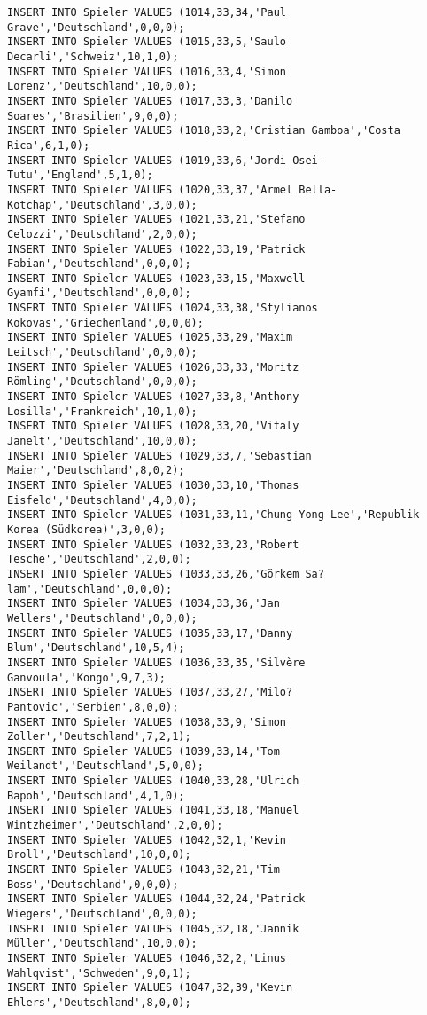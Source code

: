 \documentclass{bschlangaul-aufgabe}
\begin{document}
\begin{verbatim}
INSERT INTO Spieler VALUES (1014,33,34,'Paul Grave','Deutschland',0,0,0);
INSERT INTO Spieler VALUES (1015,33,5,'Saulo Decarli','Schweiz',10,1,0);
INSERT INTO Spieler VALUES (1016,33,4,'Simon Lorenz','Deutschland',10,0,0);
INSERT INTO Spieler VALUES (1017,33,3,'Danilo Soares','Brasilien',9,0,0);
INSERT INTO Spieler VALUES (1018,33,2,'Cristian Gamboa','Costa Rica',6,1,0);
INSERT INTO Spieler VALUES (1019,33,6,'Jordi Osei-Tutu','England',5,1,0);
INSERT INTO Spieler VALUES (1020,33,37,'Armel Bella-Kotchap','Deutschland',3,0,0);
INSERT INTO Spieler VALUES (1021,33,21,'Stefano Celozzi','Deutschland',2,0,0);
INSERT INTO Spieler VALUES (1022,33,19,'Patrick Fabian','Deutschland',0,0,0);
INSERT INTO Spieler VALUES (1023,33,15,'Maxwell Gyamfi','Deutschland',0,0,0);
INSERT INTO Spieler VALUES (1024,33,38,'Stylianos Kokovas','Griechenland',0,0,0);
INSERT INTO Spieler VALUES (1025,33,29,'Maxim Leitsch','Deutschland',0,0,0);
INSERT INTO Spieler VALUES (1026,33,33,'Moritz Römling','Deutschland',0,0,0);
INSERT INTO Spieler VALUES (1027,33,8,'Anthony Losilla','Frankreich',10,1,0);
INSERT INTO Spieler VALUES (1028,33,20,'Vitaly Janelt','Deutschland',10,0,0);
INSERT INTO Spieler VALUES (1029,33,7,'Sebastian Maier','Deutschland',8,0,2);
INSERT INTO Spieler VALUES (1030,33,10,'Thomas Eisfeld','Deutschland',4,0,0);
INSERT INTO Spieler VALUES (1031,33,11,'Chung-Yong Lee','Republik Korea (Südkorea)',3,0,0);
INSERT INTO Spieler VALUES (1032,33,23,'Robert Tesche','Deutschland',2,0,0);
INSERT INTO Spieler VALUES (1033,33,26,'Görkem Sa?lam','Deutschland',0,0,0);
INSERT INTO Spieler VALUES (1034,33,36,'Jan Wellers','Deutschland',0,0,0);
INSERT INTO Spieler VALUES (1035,33,17,'Danny Blum','Deutschland',10,5,4);
INSERT INTO Spieler VALUES (1036,33,35,'Silvère Ganvoula','Kongo',9,7,3);
INSERT INTO Spieler VALUES (1037,33,27,'Milo? Pantovic','Serbien',8,0,0);
INSERT INTO Spieler VALUES (1038,33,9,'Simon Zoller','Deutschland',7,2,1);
INSERT INTO Spieler VALUES (1039,33,14,'Tom Weilandt','Deutschland',5,0,0);
INSERT INTO Spieler VALUES (1040,33,28,'Ulrich Bapoh','Deutschland',4,1,0);
INSERT INTO Spieler VALUES (1041,33,18,'Manuel Wintzheimer','Deutschland',2,0,0);
INSERT INTO Spieler VALUES (1042,32,1,'Kevin Broll','Deutschland',10,0,0);
INSERT INTO Spieler VALUES (1043,32,21,'Tim Boss','Deutschland',0,0,0);
INSERT INTO Spieler VALUES (1044,32,24,'Patrick Wiegers','Deutschland',0,0,0);
INSERT INTO Spieler VALUES (1045,32,18,'Jannik Müller','Deutschland',10,0,0);
INSERT INTO Spieler VALUES (1046,32,2,'Linus Wahlqvist','Schweden',9,0,1);
INSERT INTO Spieler VALUES (1047,32,39,'Kevin Ehlers','Deutschland',8,0,0);

\end{verbatim}
\end{document}
